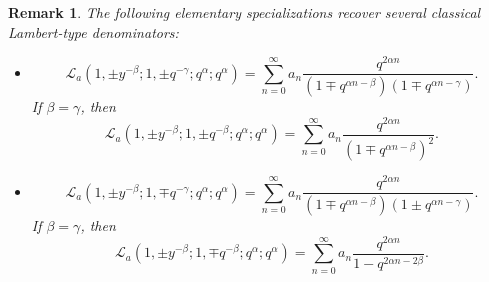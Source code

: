 \documentclass[12pt]{article}
\newtheorem{remark}{Remark}
\begin{document}
\begin{remark}
The following elementary specializations recover several classical Lambert-type denominators:
\begin{itemize}
    \item 
    \begin{equation}
    \mathcal{L}_{a}(1,\pm y^{-\beta};1,\pm q^{-\gamma};q^\alpha;q^{\alpha})=\sum_{n=0}^{\infty}a_{n}\frac{q^{2\alpha n}}{(1\mp q^{\alpha n-\beta})(1\mp q^{\alpha n-\gamma})}.
\end{equation}
If $\beta=\gamma$, then
\begin{equation}
    \mathcal{L}_{a}(1,\pm y^{-\beta};1,\pm q^{-\beta};q^\alpha;q^{\alpha})=\sum_{n=0}^{\infty}a_{n}\frac{q^{2\alpha n}}{(1\mp q^{\alpha n-\beta})^2}.
\end{equation}
\item 
\begin{equation}
    \mathcal{L}_{a}(1,\pm y^{-\beta};1,\mp q^{-\gamma};q^\alpha;q^{\alpha})=\sum_{n=0}^{\infty}a_{n}\frac{q^{2\alpha n}}{(1\mp q^{\alpha n-\beta})(1\pm q^{\alpha n-\gamma})}.
\end{equation}
If $\beta=\gamma$, then
\begin{equation}
    \mathcal{L}_{a}(1,\pm y^{-\beta};1,\mp q^{-\beta};q^\alpha;q^{\alpha})=\sum_{n=0}^{\infty}a_{n}\frac{q^{2\alpha n}}{1- q^{2\alpha n-2\beta}}.
\end{equation}
\end{itemize}
\end{remark}
\end{document}
